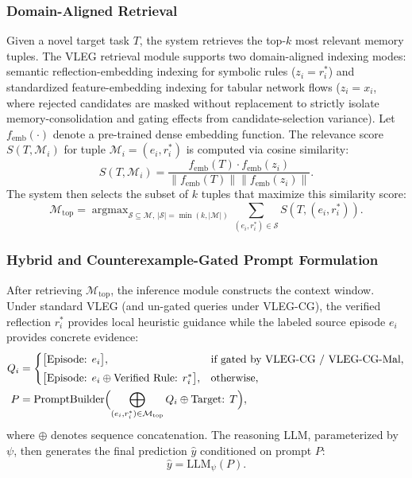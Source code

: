 \documentclass[10pt,a4paper,onecolumn]{article}
\theoremstyle{definition}
\theoremstyle{remark}
\begin{document}
\subsubsection{Domain-Aligned Retrieval}
Given a novel target task $T$, the system retrieves the top-$k$ most relevant memory tuples. The VLEG retrieval module supports two domain-aligned indexing modes: semantic reflection-embedding indexing for symbolic rules ($z_i = r_i^*$) and standardized feature-embedding indexing for tabular network flows ($z_i = x_i$, where rejected candidates are masked without replacement to strictly isolate memory-consolidation and gating effects from candidate-selection variance). Let $f_{\mathrm{emb}}(\cdot)$ denote a pre-trained dense embedding function. The relevance score $S(T, \mathcal{M}_i)$ for tuple $\mathcal{M}_i = (e_i, r_i^*)$ is computed via cosine similarity:
\begin{equation}
    S(T, \mathcal{M}_i) = \frac{f_{\mathrm{emb}}(T) \cdot f_{\mathrm{emb}}(z_i)}{\|f_{\mathrm{emb}}(T)\| \|f_{\mathrm{emb}}(z_i)\|}.
    \label{eq:cosine_sim}
\end{equation}
The system then selects the subset of $k$ tuples that maximize this similarity score:
\begin{equation}
    \mathcal{M}_{\mathrm{top}} = \mathop{\arg\max}_{\mathcal{S} \subseteq \mathcal{M},\, |\mathcal{S}|=\min(k,|\mathcal{M}|)} \sum_{(e_i, r_i^*) \in \mathcal{S}} S(T, (e_i, r_i^*)).
    \label{eq:top_k}
\end{equation}

\subsubsection{Hybrid and Counterexample-Gated Prompt Formulation}
After retrieving $\mathcal{M}_{\mathrm{top}}$, the inference module constructs the context window. Under standard VLEG (and un-gated queries under VLEG-CG), the verified reflection $r_i^*$ provides local heuristic guidance while the labeled source episode $e_i$ provides concrete evidence:
\begin{equation}
\begin{aligned}
    Q_i &= \begin{cases}
        \big[\text{Episode: }e_i\big], & \text{if gated by VLEG-CG / VLEG-CG-Mal},\\[0.3em]
        \big[\text{Episode: }e_i \oplus \text{Verified Rule: }r_i^*\big], & \text{otherwise},
    \end{cases}\\
    P &= \mathrm{PromptBuilder}\Bigl(\bigoplus_{(e_i,r_i^*)\in\mathcal{M}_{\mathrm{top}}} Q_i \oplus \text{Target: }T\Bigr),
\end{aligned}
\label{eq:prompt_builder}
\end{equation}
where $\oplus$ denotes sequence concatenation. The reasoning LLM, parameterized by $\psi$, then generates the final prediction $\hat{y}$ conditioned on prompt $P$:
\begin{equation}
    \hat{y} = \mathrm{LLM}_\psi(P).
    \label{eq:llm_pred}
\end{equation}
\end{document}
